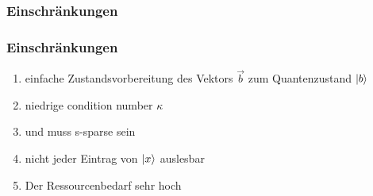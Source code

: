 \subsubsection{Einschränkungen}
\begin{frame}
    \frametitle{Einschränkungen}
    \begin{enumerate}
        \item einfache Zustandsvorbereitung des Vektors $\vec b$ zum Quantenzustand $\ket{b}$

        \hfil

        \item niedrige condition number $\kappa$ 

        \hfil


        \item und muss s-sparse sein

        \hfil


        \item nicht jeder Eintrag von $\ket{x}$ auslesbar

        \hfil


        \item Der Ressourcenbedarf sehr hoch


    \end{enumerate}

\end{frame}


